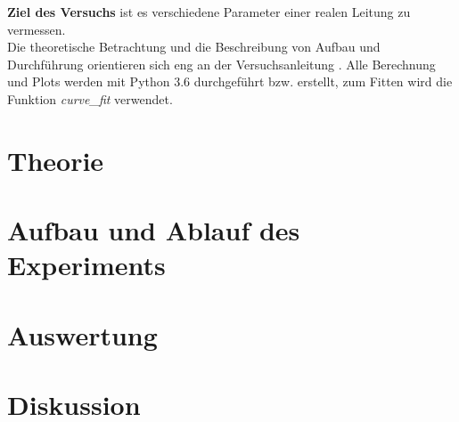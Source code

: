 \documentclass[a4,11pt]{article}
\newcommand{\V}{E2}
\begin{document}



\tableofcontents
\clearpage


\textbf{Ziel des Versuchs} ist es verschiedene Parameter einer realen Leitung zu vermessen. \\
Die theoretische Betrachtung und die Beschreibung von Aufbau und Durchführung orientieren sich eng an der Versuchsanleitung \cite{\V}. Alle Berechnung und Plots werden mit Python 3.6 durchgeführt bzw. erstellt, zum Fitten wird die Funktion \textit{curve\_fit} verwendet.

\section{Theorie}

\clearpage


\section{Aufbau und Ablauf des Experiments}

\clearpage


\section{Auswertung}

\clearpage


\section{Diskussion}


\clearpage
\listoftodos
\listoffigures
\listoftables
\clearpage
\nocite{\V}
\printbibliography[title = Literaturverzeichnis]
\end{document}
